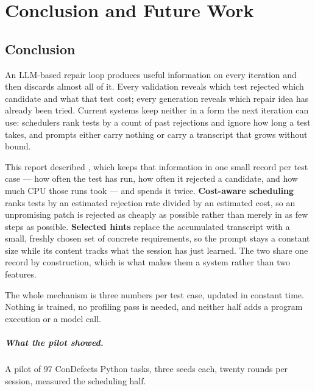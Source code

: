 \chapter{Conclusion and Future Work}
\label{ch:conclusion}

\section{Conclusion}

An LLM-based repair loop produces useful information on every iteration and
then discards almost all of it. Every validation reveals which test rejected
which candidate and what that test cost; every generation reveals which repair
idea has already been tried. Current systems keep neither in a form the next
iteration can use: schedulers rank tests by a count of past rejections and
ignore how long a test takes, and prompts either carry nothing or carry a
transcript that grows without bound.

This report described \caster, which keeps that information in one small record
per test case --- how often the test has run, how often it rejected a
candidate, and how much CPU those runs took --- and spends it twice.
\textbf{Cost-aware scheduling} ranks tests by an estimated rejection rate
divided by an estimated cost, so an unpromising patch is rejected as cheaply as
possible rather than merely in as few steps as possible. \textbf{Selected
hints} replace the accumulated transcript with a small, freshly chosen set of
concrete requirements, so the prompt stays a constant size while its content
tracks what the session has just learned. The two share one record by
construction, which is what makes them a system rather than two features.

The whole mechanism is three numbers per test case, updated in constant time.
Nothing is trained, no profiling pass is needed, and neither half adds a
program execution or a model call.

\paragraph{What the pilot showed.} A pilot of $97$ ConDefects Python tasks,
three seeds each, twenty rounds per session, measured the scheduling half.

